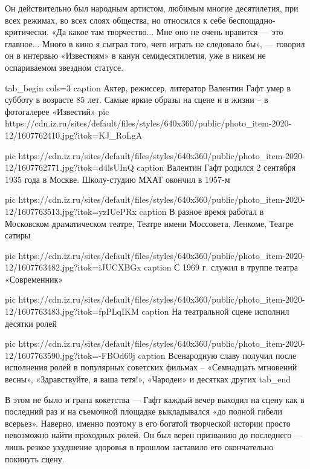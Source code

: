 Он действительно был народным артистом, любимым многие десятилетия, при всех
режимах, во всех слоях общества, но относился к себе беспощадно-критически. «Да
какое там творчество... Мне оно не очень нравится — это главное... Много в кино
я сыграл того, чего играть не следовало бы», — говорил он в интервью
«Известиям» в канун семидесятилетия, уже в никем не оспариваемом звездном
статусе.
 
\ifcmt
	tab_begin cols=3
		caption Актер, режиссер, литератор Валентин Гафт умер в субботу в возрасте 85 лет. Самые яркие образы на сцене и в жизни – в фотогалерее «Известий»
		pic https://cdn.iz.ru/sites/default/files/styles/640x360/public/photo_item-2020-12/1607762410.jpg?itok=KJ_RoLgA

		pic https://cdn.iz.ru/sites/default/files/styles/640x360/public/photo_item-2020-12/1607762771.jpg?itok=d4lsUInQ
		caption Валентин Гафт родился 2 сентября 1935 года в Москве. Школу-студию МХАТ окончил в 1957-м

		pic https://cdn.iz.ru/sites/default/files/styles/640x360/public/photo_item-2020-12/1607763513.jpg?itok=yzIUePRx
		caption В разное время работал в Московском драматическом театре, Театре имени Моссовета, Ленкоме, Театре сатиры

		pic https://cdn.iz.ru/sites/default/files/styles/640x360/public/photo_item-2020-12/1607763482.jpg?itok=iJUCXBGx
		caption С 1969 г. служил в труппе театра «Современник»

		pic https://cdn.iz.ru/sites/default/files/styles/640x360/public/photo_item-2020-12/1607763483.jpg?itok=fpPLqIKM
		caption На театральной сцене исполнил десятки ролей

		pic https://cdn.iz.ru/sites/default/files/styles/640x360/public/photo_item-2020-12/1607763590.jpg?itok=-FBOd69j
		caption Всенародную славу получил после исполнения ролей в популярных советских фильмах – «Семнадцать мгновений весны», «Здравствуйте, я ваша тетя!», «Чародеи» и десятках других
tab_end 
\fi

В этом не было и грана кокетства — Гафт каждый вечер выходил на сцену как в
последний раз и на съемочной площадке выкладывался «до полной гибели всерьез».
Наверно, именно поэтому в его богатой творческой истории просто невозможно
найти проходных ролей. Он был верен призванию до последнего — лишь резкое
ухудшение здоровья в прошлом заставило его окончательно покинуть сцену. 
